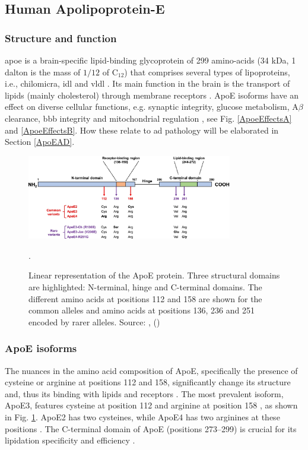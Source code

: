 \documentclass{amsart}
\begin{document}
\subsection{Human Apolipoprotein-E}\label{ApoEprot}
\subsubsection{Structure and function}
\acrshort{apoe} is a brain-specific lipid-binding glycoprotein of 299 amino-acids (34 kDa, 1 dalton is the mass of $1/12$ of C$_{12}$) that comprises several types of lipoproteins, i.e., chilomicra, \acrlong{idl} and \acrlong{vldl} \cite{Husain2021APOETherapeutics}. Its main function in the brain is the transport of lipids (mainly cholesterol) through membrane receptors \cite{Yang2023ApolipoproteinDisease}. ApoE isoforms have an effect on diverse cellular functions, e.g. synaptic integrity, glucose metabolism, A$\beta$ clearance, \acrlong{bbb} integrity and mitochondrial regulation \cite{Husain2021APOETherapeutics}, see Fig. \ref{ApoeEffectsA} and \ref{ApoeEffectsB}. How these relate to \acrshort{ad} pathology will be elaborated in Section \ref{ApoEAD}.

\begin{figure}[htb]
  \includegraphics[width=0.8\textwidth]{figures/ApoEprot.png}
    \caption{Linear representation of the ApoE protein. Three structural domains are highlighted: N-terminal, hinge and C-terminal domains. The different amino acids at positions 112 and 158 are shown for the common alleles and amino acids at positions 136, 236 and 251 encoded by rarer alleles. Source: ,  (\citeyear{Bu2022APOEVariants}) \cite{Bu2022APOEVariants}}.
  \label{fig2}
\end{figure}

\subsubsection{ApoE isoforms}
The nuances in the amino acid composition of ApoE, specifically the presence of cysteine or arginine at positions 112 and 158, significantly change its structure and, thus its binding with lipids and receptors \cite{Yassine2020APOEDisease}. The most prevalent isoform, ApoE3, features cysteine at position 112 and arginine at position 158  \cite{Yassine2020APOEDisease}, as shown in Fig. \ref{fig2}. ApoE2 has two cysteines, while ApoE4 has two arginines at these positions \cite{Yassine2020APOEDisease}. The C-terminal domain of ApoE (positions 273–299) is crucial for its lipidation specificity and efficiency \cite{Hu2015OpposingMice}.
\end{document}
